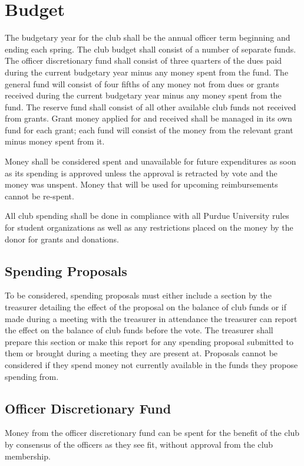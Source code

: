 \documentclass{article}
\begin{document}
\section{Budget}

The budgetary year for the club shall be the annual officer term beginning and
ending each spring. The club budget shall consist of a number of separate funds.
The officer discretionary fund shall consist of three quarters of the dues paid
during the current budgetary year minus any money spent from the fund. The
general fund will consist of four fifths of any money not from dues or grants
received during the current budgetary year minus any money spent from the fund.
The reserve fund shall consist of all other available club funds not received
from grants. Grant money applied for and received shall be managed in its own
fund for each grant; each fund will consist of the money from the relevant grant
minus money spent from it.

Money shall be considered spent and unavailable for future expenditures as soon
as its spending is approved unless the approval is retracted by vote and the
money was unspent. Money that will be used for upcoming reimbursements cannot be
re-spent.

All club spending shall be done in compliance with all Purdue University rules
for student organizations as well as any restrictions placed on the money by the
donor for grants and donations.

\subsection{Spending Proposals}

To be considered, spending proposals must either include a section by the
treasurer detailing the effect of the proposal on the balance of club funds or
if made during a meeting with the treasurer in attendance the treasurer can
report the effect on the balance of club funds before the vote. The treasurer
shall prepare this section or make this report for any spending proposal
submitted to them or brought during a meeting they are present at. Proposals
cannot be considered if they spend money not currently available in the funds
they propose spending from.

\subsection{Officer Discretionary Fund}

Money from the officer discretionary fund can be spent for the benefit of the
club by consensus of the officers as they see fit, without approval from the
club membership.
\end{document}
